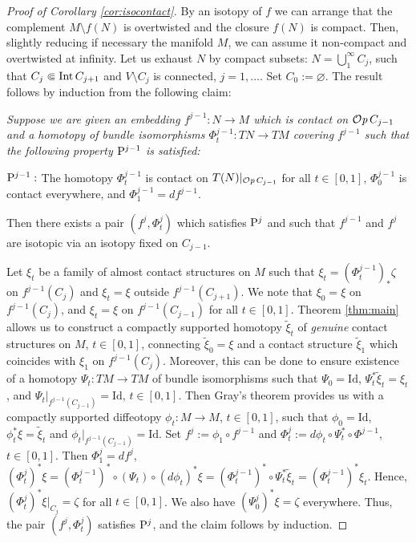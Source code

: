 \documentclass[12pt]{paper}
\theoremstyle{plain}
\theoremstyle{definition}
\newcommand{\wt}{\widetilde}
\newcommand{\Int}{{\rm Int\,}} %
\newcommand{\Id}{\mathrm {Id}}
\def\Op{{\mathcal O}{\it p}\,}
\numberwithin{figure}{section}
\begin{document}
 

\begin{proof}[Proof of Corollary \ref{cor:isocontact}] By an isotopy of $f$ we can arrange that the complement $M\setminus f(N)$ is overtwisted and the closure $f(N)$ is compact. Then, slightly reducing  if necessary  the manifold  $M$, we can assume it non-compact and overtwisted at infinity. 	 Let us exhaust $N$ by compact subsets: $N=\bigcup\limits_1^\infty C_j$,  such that $C_j\Subset\Int C_{j+1}$ and $V\setminus  C_j$ is connected, $ j=1,\dots $.  Set $C_0:=\varnothing$.  The result follows by induction from the following claim:

{\em Suppose we are given  an embedding    $f^{j-1}:N\to M$ which  is  contact on $\Op C_{j-1}$ and   a  homotopy  of bundle isomorphisms  $\Phi^{j-1}_{t} :TN\to  TM$   covering $f^{j-1}$ such that the following property  ${\rm P}^{j-1}$ is satisfied:
\begin{description}
\item{${\rm P}^{j-1}:$} The homotopy $\Phi^{j-1}_t$ is contact on $T(N)|_{\Op C_{j-1}}$ for all $t\in[0,1]$,  
 $\Phi^{j-1}_0$ is   contact everywhere, and 
   $\Phi^{j-1}_1=df^{j-1}$.
 \end{description}
Then  there exists a pair $(f^j,\Phi_t^j)$ which satisfies ${\rm P}^{j}$ and such that $f^{j-1}$ and $f^j$ are   isotopic via an isotopy fixed on $C_{j-1}$.}
 
 
 Let $\xi_t$ be a family of almost  contact structures on $M$ such that $\xi_t=(\Phi^{j-1}_t)_*\zeta$ on $f^{j-1}(C_j)$ and $\xi_t=\xi$ outside $f^{j-1}(C_{j+1})$. We note that $\xi_0=\xi$ on $f^{j-1}(C_j)$,  and $\xi_t=\xi$ on $f^{j-1}(C_{j-1})$ for all $t\in[0,1]$.
 Theorem \ref{thm:main} allows us to construct  a  compactly supported homotopy $\wt \xi_{t}$ of {\em genuine} contact structures on $M$,  $t\in[0,1]$,  connecting $\wt \xi_0=\xi$ and  a contact structure $\wt\xi_1$ which coincides with $\xi_1$ on $f^{j-1}(C_j)$. Moreover, this can be done to ensure  existence of a homotopy $\Psi_t:TM\to TM$ of bundle isomorphisms such that $\Psi_0=\Id$, $\Psi_t^*\wt\xi_t=\xi_t$,  and $\Psi_t|_{f^{j-1}(C_{j-1})}=\Id$, $t\in[0,1]$. Then Gray's  theorem \cite{Gray59} provides us with   a compactly supported diffeotopy $\phi_t:M\to M$, $t\in[0,1]$, such that $\phi_0=\Id$, $\phi_t^*\xi =\wt \xi_{t}$ and $\phi_t|_{f^{j-1}(C_{j-1})}=\Id$. 
   Set $f^j:=\phi_1\circ f^{j-1}$ and $\Phi^j_{t}:= d\phi_t\circ \Psi_t^*\circ\Phi^{j-1}$, $t\in[0,1]$.
 Then  $\Phi^j_1=df^j$, $(\Phi^j_t)^*\xi= (\Phi^{j-1}_t)^*\circ(\Psi_{t}) \circ (d\phi_t)^*\xi= (\Phi^{j-1}_t)^*\circ\Psi_t^*\wt\xi_{t}= (\Phi^{j-1}_t)^*\xi_t$.
 Hence,  $(\Phi^j_t)^*\xi|_{C_j}=\zeta$ for all $t\in[0,1]$. We also have
 $(\Psi^j_0)^*\xi=\zeta$ everywhere. Thus, the pair
 $(f^j,\Phi^j_t)$ satisfies ${\rm P}^{j}$, and the claim follows by induction.
   \end{proof}
\end{document}
